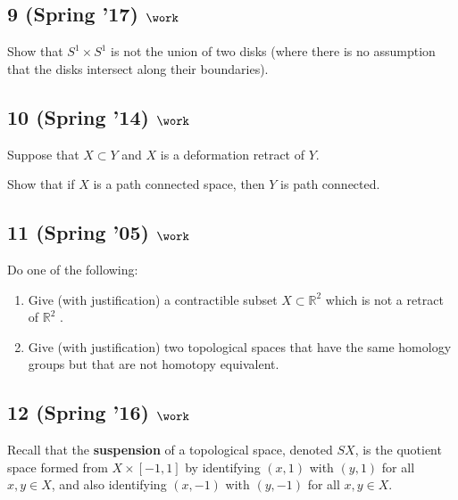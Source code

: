\hypertarget{spring-17-work-3}{%
\subsection{\texorpdfstring{9 (Spring '17)
\(\work\)}{9 (Spring '17) \textbackslash work}}\label{spring-17-work-3}}

Show that \(S^1 \times S^1\) is not the union of two disks (where there
is no assumption that the disks intersect along their boundaries).

\hypertarget{spring-14-work-4}{%
\subsection{\texorpdfstring{10 (Spring '14)
\(\work\)}{10 (Spring '14) \textbackslash work}}\label{spring-14-work-4}}

Suppose that \(X \subset Y\) and \(X\) is a deformation retract of
\(Y\).

Show that if \(X\) is a path connected space, then \(Y\) is path
connected.

\hypertarget{spring-05-work-1}{%
\subsection{\texorpdfstring{11 (Spring '05)
\(\work\)}{11 (Spring '05) \textbackslash work}}\label{spring-05-work-1}}

Do one of the following:

\begin{enumerate}
\def\labelenumi{\alph{enumi}.}
\item
  Give (with justification) a contractible subset
  \(X \subset {\mathbb{R}}^2\) which is not a retract of
  \({\mathbb{R}}^2\) .
\item
  Give (with justification) two topological spaces that have the same
  homology groups but that are not homotopy equivalent.
\end{enumerate}

\hypertarget{spring-16-work-4}{%
\subsection{\texorpdfstring{12 (Spring '16)
\(\work\)}{12 (Spring '16) \textbackslash work}}\label{spring-16-work-4}}

Recall that the \textbf{suspension} of a topological space, denoted
\(SX\), is the quotient space formed from \(X \times [-1, 1]\) by
identifying \((x, 1)\) with \((y, 1)\) for all \(x, y \in X\), and also
identifying \((x, -1)\) with \((y, -1)\) for all \(x, y \in X\).

